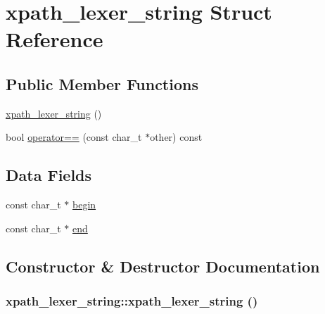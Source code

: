 \hypertarget{structxpath__lexer__string}{
\section{xpath\_\-lexer\_\-string Struct Reference}
\label{structxpath__lexer__string}
}
\subsection*{Public Member Functions}
\begin{DoxyCompactItemize}
\item 
\hyperlink{structxpath__lexer__string_a3e60ca9bfea3cf907582eb527479e304}{xpath\_\-lexer\_\-string} ()
\item 
bool \hyperlink{structxpath__lexer__string_ac19adfd75832be8eff3f430aa3cb3c14}{operator==} (const char\_\-t $\ast$other) const 
\end{DoxyCompactItemize}
\subsection*{Data Fields}
\begin{DoxyCompactItemize}
\item 
const char\_\-t $\ast$ \hyperlink{structxpath__lexer__string_a0b985863d7363a75d4fdd0a7ece1fca0}{begin}
\item 
const char\_\-t $\ast$ \hyperlink{structxpath__lexer__string_a13bbedeca2f8c2fb1e294325eea66878}{end}
\end{DoxyCompactItemize}


\subsection{Constructor \& Destructor Documentation}
\hypertarget{structxpath__lexer__string_a3e60ca9bfea3cf907582eb527479e304}{
\subsubsection[{xpath\_\-lexer\_\-string}]{\setlength{\rightskip}{0pt plus 5cm}xpath\_\-lexer\_\-string::xpath\_\-lexer\_\-string ()}}
\label{structxpath__lexer__string_a3e60ca9bfea3cf907582eb527479e304}


